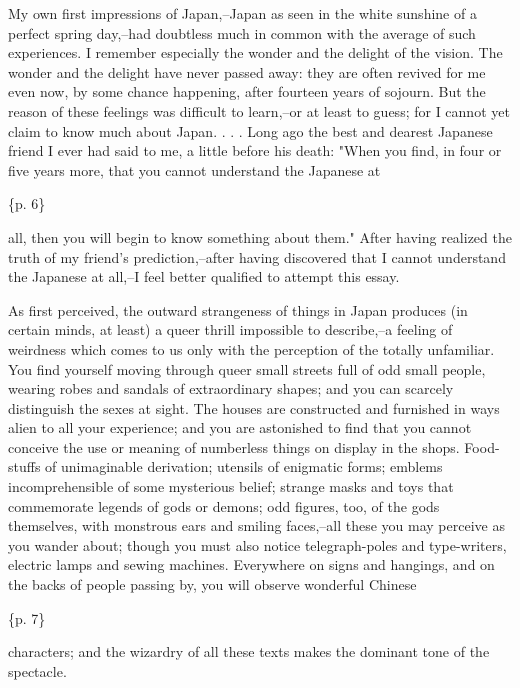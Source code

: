 My own first impressions of Japan,--Japan as seen in the white sunshine of a perfect spring day,--had doubtless much in common with the average of such experiences. I remember especially the wonder and the delight of the vision. The wonder and the delight have never passed away: they are often revived for me even now, by some chance happening, after fourteen years of sojourn. But the reason of these feelings was difficult to learn,--or at least to guess; for I cannot yet claim to know much about Japan. . . . Long ago the best and dearest Japanese friend I ever had said to me, a little before his death: "When you find, in four or five years more, that you cannot understand the Japanese at

\{p. 6\}

all, then you will begin to know something about them." After having realized the truth of my friend's prediction,--after having discovered that I cannot understand the Japanese at all,--I feel better qualified to attempt this essay.



As first perceived, the outward strangeness of things in Japan produces (in certain minds, at least) a queer thrill impossible to describe,--a feeling of weirdness which comes to us only with the perception of the totally unfamiliar. You find yourself moving through queer small streets full of odd small people, wearing robes and sandals of extraordinary shapes; and you can scarcely distinguish the sexes at sight. The houses are constructed and furnished in ways alien to all your experience; and you are astonished to find that you cannot conceive the use or meaning of numberless things on display in the shops. Food-stuffs of unimaginable derivation; utensils of enigmatic forms; emblems incomprehensible of some mysterious belief; strange masks and toys that commemorate legends of gods or demons; odd figures, too, of the gods themselves, with monstrous ears and smiling faces,--all these you may perceive as you wander about; though you must also notice telegraph-poles and type-writers, electric lamps and sewing machines. Everywhere on signs and hangings, and on the backs of people passing by, you will observe wonderful Chinese

\{p. 7\}

characters; and the wizardry of all these texts makes the dominant tone of the spectacle.

